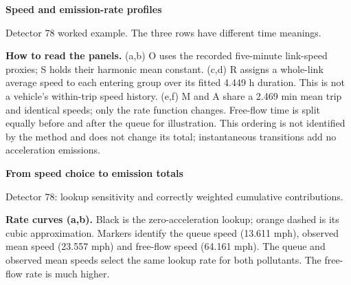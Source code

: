 
\newpage
{\fontsize{19}{22}\selectfont\bfseries\color{navy}Speed and emission-rate profiles}\par
{\color{muted}Detector 78 worked example. The three rows have different time meanings.}\par
\vspace{5pt}
\quad{}\quad{}\quad{}\quad{}
\par\vspace{8pt}\begin{center}\resizebox{\linewidth}{!}{}\end{center}
\textbf{How to read the panels.}
(a,b) O uses the recorded five-minute link-speed proxies; S holds their harmonic mean constant.
(c,d) R assigns a whole-link average speed to each entering group over its fitted 4.449 h duration.
This is not a vehicle's within-trip speed history. (e,f) M and A share a 2.469 min mean trip and identical speeds;
only the rate function changes. Free-flow time is split equally before and after the queue for illustration.
This ordering is not identified by the method and does not change its total; instantaneous transitions add no acceleration emissions.


\newpage
{\fontsize{19}{22}\selectfont\bfseries\color{navy}From speed choice to emission totals}\par
{\color{muted}Detector 78: lookup sensitivity and correctly weighted cumulative contributions.}\par
\vspace{5pt}
\quad{}\quad{}\quad{}\quad{}
\par\vspace{8pt}\begin{center}\resizebox{\linewidth}{!}{}\end{center}
\textbf{Rate curves (a,b).} Black is the zero-acceleration lookup; orange dashed is its cubic approximation.
Markers identify the queue speed (13.611 mph), observed mean speed (23.557 mph) and free-flow speed (64.161 mph).
The queue and observed mean speeds select the same lookup rate for both pollutants. The free-flow rate is much higher.

